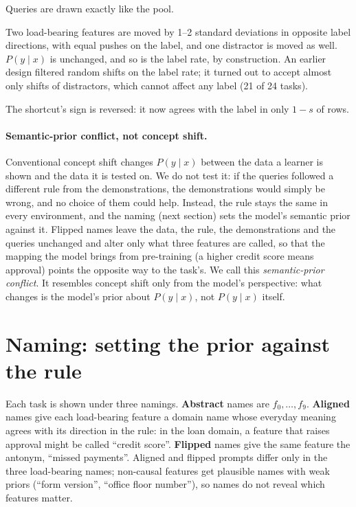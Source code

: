 \begin{description}[leftmargin=1.5em, style=nextline]
  \item[In distribution (ID)] Queries are drawn exactly like the pool.
  \item[Covariate shift] Two load-bearing features are moved by 1--2 standard deviations in opposite label directions, with equal pushes on the label, and one distractor is moved as well.
        $P(y \mid x)$ is unchanged, and so is the label rate, by construction.
        An earlier design filtered random shifts on the label rate; it turned out to accept almost only shifts of distractors, which cannot affect any label (21 of 24 tasks).
  \item[Spurious reversal] The shortcut's sign is reversed: it now agrees with the label in only $1-s$ of rows.
\end{description}

\paragraph{Semantic-prior conflict, not concept shift.}
Conventional concept shift changes $P(y \mid x)$ between the data a learner is shown and the data it is tested on.
We do not test it: if the queries followed a different rule from the demonstrations, the demonstrations would simply be wrong, and no choice of them could help.
Instead, the rule stays the same in every environment, and the naming (next section) sets the model's semantic prior against it.
Flipped names leave the data, the rule, the demonstrations and the queries unchanged and alter only what three features are called, so that the mapping the model brings from pre-training (a higher credit score means approval) points the opposite way to the task's.
We call this \emph{semantic-prior conflict}.
It resembles concept shift only from the model's perspective: what changes is the model's prior about $P(y \mid x)$, not $P(y \mid x)$ itself.

\section{Naming: setting the prior against the rule}
\label{sec:naming}

Each task is shown under three namings.
\textbf{Abstract} names are $f_0, \ldots, f_9$.
\textbf{Aligned} names give each load-bearing feature a domain name whose everyday meaning agrees with its direction in the rule: in the loan domain, a feature that raises approval might be called ``credit score''.
\textbf{Flipped} names give the same feature the antonym, ``missed payments''.
Aligned and flipped prompts differ only in the three load-bearing names; non-causal features get plausible names with weak priors (``form version'', ``office floor number''), so names do not reveal which features matter.

